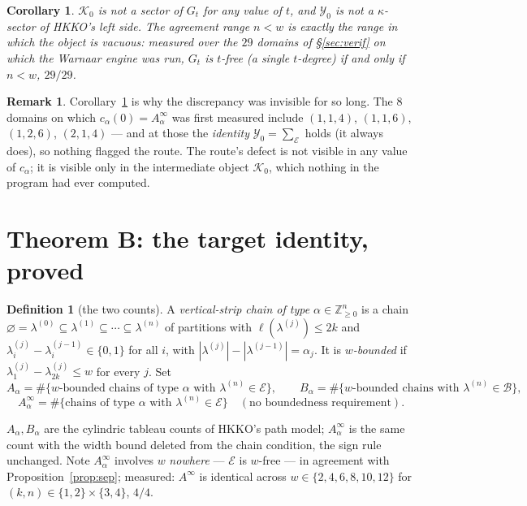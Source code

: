 \documentclass[11pt]{article}
\theoremstyle{plain}
\newtheorem{corollary}[theorem]{Corollary}
\theoremstyle{definition}
\newtheorem{definition}[theorem]{Definition}
\newtheorem{remark}[theorem]{Remark}
\newcommand{\Z}{\mathbb{Z}}
\begin{document}
\begin{corollary}\label{cor:A}
$\mathcal K_0$ is not a sector of $G_t$ for any value of $t$, and $\mathcal Y_0$ is not a
$\kappa$-sector of HKKO's left side.  The agreement range $n<w$ is exactly the range in
which the object is vacuous: measured over the $29$ domains of \S\ref{sec:verif} on which
the Warnaar engine was run, $G_t$ is $t$-free (a single $t$-degree) if and only if $n<w$,
$29/29$.
\end{corollary}

\begin{remark}
Corollary~\ref{cor:A} is why the discrepancy was invisible for so long.  The $8$ domains on
which $c_\alpha(0)=A^\infty_\alpha$ was first measured include $(1,1,4)$, $(1,1,6)$,
$(1,2,6)$, $(2,1,4)$ --- and at those the \emph{identity} $\mathcal Y_0=\sum_{\mathcal E}$
holds (it always does), so nothing flagged the route.  The route's defect is not visible in
any value of $c_\alpha$; it is visible only in the intermediate object $\mathcal K_0$, which
nothing in the program had ever computed.
\end{remark}

\section{Theorem B: the target identity, proved}\label{sec:B}

\begin{definition}[the two counts]\label{def:AB}
A \emph{vertical-strip chain of type $\alpha\in\Z_{\ge0}^n$} is a chain
$\varnothing=\lambda^{(0)}\subseteq\lambda^{(1)}\subseteq\cdots\subseteq\lambda^{(n)}$ of
partitions with $\ell(\lambda^{(j)})\le 2k$ and
$\lambda^{(j)}_i-\lambda^{(j-1)}_i\in\{0,1\}$ for all $i$, with
$|\lambda^{(j)}|-|\lambda^{(j-1)}|=\alpha_j$.  It is \emph{$w$-bounded} if
$\lambda^{(j)}_1-\lambda^{(j)}_{2k}\le w$ for every $j$.  Set
\[
  A_\alpha=\#\{w\text{-bounded chains of type }\alpha\text{ with }
      \lambda^{(n)}\in\mathcal E\},\qquad
  B_\alpha=\#\{w\text{-bounded chains with }\lambda^{(n)}\in\mathcal B\},
\]
\[
  A^\infty_\alpha=\#\{\text{chains of type }\alpha\text{ with }
      \lambda^{(n)}\in\mathcal E\}\quad(\text{no boundedness requirement}).
\]
\end{definition}
$A_\alpha,B_\alpha$ are the cylindric tableau counts of HKKO's path model; $A^\infty_\alpha$
is the same count with the width bound deleted from the chain condition, the sign rule
unchanged.  Note $A^\infty_\alpha$ involves $w$ \emph{nowhere} --- $\mathcal E$ is $w$-free ---
in agreement with Proposition~\ref{prop:sep}; measured: $A^\infty$ is identical across
$w\in\{2,4,6,8,10,12\}$ for $(k,n)\in\{1,2\}\times\{3,4\}$, $4/4$.
\end{document}
